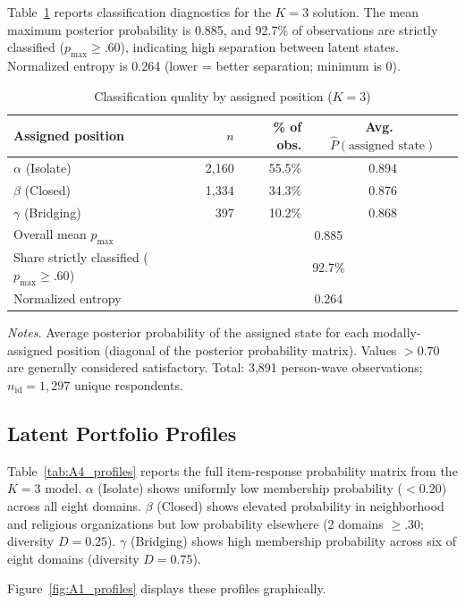 \documentclass[12pt, a4paper]{article}
\newcommand{\tablenote}[1]{\vspace{4pt}\par\footnotesize\textit{Notes.} #1}
\begin{document}
Table~\ref{tab:A3_classquality} reports classification diagnostics for the
$K = 3$ solution. The mean maximum posterior probability is 0.885, and
92.7\% of observations are strictly classified ($p_{\max} \geq .60$),
indicating high separation between latent states. Normalized entropy is
0.264 (lower = better separation; minimum is 0).

\begin{table}[H]
\centering
\caption{Classification quality by assigned position ($K = 3$)}
\label{tab:A3_classquality}
\small
\begin{tabular}{lrrc}
\hline\hline
  Assigned position & $n$ & \% of obs. & Avg.\ $\hat{P}(\text{assigned state})$ \\
\hline
  $\alpha$ (Isolate)   & 2,160 & 55.5\% & 0.894 \\
  $\beta$  (Closed)    & 1,334 & 34.3\% & 0.876 \\
  $\gamma$ (Bridging)  &   397 & 10.2\% & 0.868 \\
\hline
  Overall mean $p_{\max}$                        & \multicolumn{3}{c}{0.885} \\
  Share strictly classified ($p_{\max} \geq .60$) & \multicolumn{3}{c}{92.7\%} \\
  Normalized entropy                              & \multicolumn{3}{c}{0.264} \\
\hline\hline
\end{tabular}
\tablenote{Average posterior probability of the assigned state for each
modally-assigned position (diagonal of the posterior probability matrix).
Values $> 0.70$ are generally considered satisfactory.
Total: 3,891 person-wave observations; $n_\text{id} = 1{,}297$ unique respondents.}
\end{table}

\subsection{Latent Portfolio Profiles}

Table~\ref{tab:A4_profiles} reports the full item-response probability
matrix from the $K = 3$ model. $\alpha$ (Isolate) shows uniformly low
membership probability ($< 0.20$) across all eight domains.
$\beta$ (Closed) shows elevated probability in neighborhood and religious
organizations but low probability elsewhere (2 domains $\geq .30$;
diversity $D = 0.25$). $\gamma$ (Bridging) shows high membership probability
across six of eight domains (diversity $D = 0.75$).

Figure~\ref{fig:A1_profiles} displays these profiles graphically.
\end{document}
